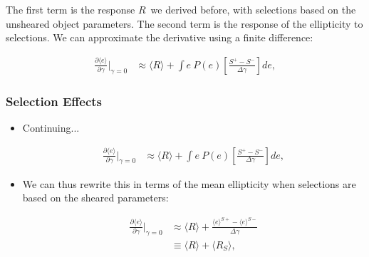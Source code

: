 \documentclass{beamer}
\newcommand{\mest}{e}
\newcommand{\mcalR}{$R$}
\newcommand{\mcalRS}{$R_{S}$}
\begin{document}
{\begin{itemize}
            The first term is the response \mcalR\ we derived before, with
            selections based on the unsheared object parameters.  The second
            term is the response of the ellipticity to selections.  We can
            approximate the derivative using a finite difference:

            \begin{align}
                \frac{\partial \langle \mest \rangle}{\partial \gamma}\bigg|_{\gamma=0}
                &\approx
                \langle \mbox{\mcalR} \rangle + \int \mest~P(\mest) \left[ \frac{ S^+ - S^- }{\Delta \gamma}\right] d\mest,
            \end{align}

    \end{itemize}

}

\frame
{
    \frametitle{Selection Effects}

 
    \begin{itemize}

        \item Continuing...

            \begin{align}
                \frac{\partial \langle \mest \rangle}{\partial \gamma}\bigg|_{\gamma=0}
                &\approx
                \langle \mbox{\mcalR} \rangle + \int \mest~P(\mest) \left[ \frac{ S^+ - S^- }{\Delta \gamma}\right] d\mest,
            \end{align}

        \item  We can thus rewrite this in terms of the mean ellipticity when
            selections are based on the sheared parameters:

            \begin{align}
                \frac{\partial \langle \mest \rangle}{\partial \gamma}\bigg|_{\gamma=0} &\approx
                \langle R \rangle + \frac{\langle \mest \rangle^{S+} - \langle \mest \rangle^{S-}}{\Delta \gamma} \nonumber \\
                &\equiv \langle R \rangle + \langle \mbox{\mcalRS} \rangle,
            \end{align}

    \end{itemize}

}
\end{document}
